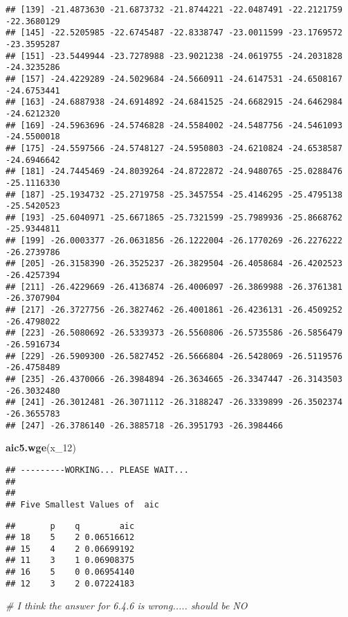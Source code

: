 \documentclass[
]{article}
\newenvironment{Shaded}{\begin{snugshade}}{\end{snugshade}}
\newcommand{\CommentTok}[1]{\textcolor[rgb]{0.56,0.35,0.01}{\textit{#1}}}
\newcommand{\DecValTok}[1]{\textcolor[rgb]{0.00,0.00,0.81}{#1}}
\newcommand{\KeywordTok}[1]{\textcolor[rgb]{0.13,0.29,0.53}{\textbf{#1}}}
\newcommand{\NormalTok}[1]{#1}
\begin{document}
\begin{verbatim}
## [139] -21.4873630 -21.6873732 -21.8744221 -22.0487491 -22.2121759 -22.3680129
## [145] -22.5205985 -22.6745487 -22.8338747 -23.0011599 -23.1769572 -23.3595287
## [151] -23.5449944 -23.7278988 -23.9021238 -24.0619755 -24.2031828 -24.3235286
## [157] -24.4229289 -24.5029684 -24.5660911 -24.6147531 -24.6508167 -24.6753441
## [163] -24.6887938 -24.6914892 -24.6841525 -24.6682915 -24.6462984 -24.6212320
## [169] -24.5963696 -24.5746828 -24.5584002 -24.5487756 -24.5461093 -24.5500018
## [175] -24.5597566 -24.5748127 -24.5950803 -24.6210824 -24.6538587 -24.6946642
## [181] -24.7445469 -24.8039264 -24.8722872 -24.9480765 -25.0288476 -25.1116330
## [187] -25.1934732 -25.2719758 -25.3457554 -25.4146295 -25.4795138 -25.5420523
## [193] -25.6040971 -25.6671865 -25.7321599 -25.7989936 -25.8668762 -25.9344811
## [199] -26.0003377 -26.0631856 -26.1222004 -26.1770269 -26.2276222 -26.2739786
## [205] -26.3158390 -26.3525237 -26.3829504 -26.4058684 -26.4202523 -26.4257394
## [211] -26.4229669 -26.4136874 -26.4006097 -26.3869988 -26.3761381 -26.3707904
## [217] -26.3727756 -26.3827462 -26.4001861 -26.4236131 -26.4509252 -26.4798022
## [223] -26.5080692 -26.5339373 -26.5560806 -26.5735586 -26.5856479 -26.5916734
## [229] -26.5909300 -26.5827452 -26.5666804 -26.5428069 -26.5119576 -26.4758489
## [235] -26.4370066 -26.3984894 -26.3634665 -26.3347447 -26.3143503 -26.3032480
## [241] -26.3012481 -26.3071112 -26.3188247 -26.3339899 -26.3502374 -26.3655783
## [247] -26.3786140 -26.3885718 -26.3951793 -26.3984466
\end{verbatim}

\begin{Shaded}
\begin{Highlighting}[]
\KeywordTok{aic5.wge}\NormalTok{(x_}\DecValTok{12}\NormalTok{)}
\end{Highlighting}
\end{Shaded}

\begin{verbatim}
## ---------WORKING... PLEASE WAIT... 
## 
## 
## Five Smallest Values of  aic
\end{verbatim}

\begin{verbatim}
##       p    q        aic
## 18    5    2 0.06516612
## 15    4    2 0.06699192
## 11    3    1 0.06908375
## 16    5    0 0.06954140
## 12    3    2 0.07224183
\end{verbatim}

\begin{Shaded}
\begin{Highlighting}[]
\CommentTok{# I think the answer for 6.4.6 is wrong..... should be NO}
\end{Highlighting}
\end{Shaded}
\end{document}
